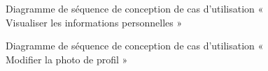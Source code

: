 \begin{figure}[H]
  \centering
  \caption{Diagramme de séquence de conception de cas d'utilisation «  Visualiser les informations personnelles »}
  \label{fig:conception_sequence_visualiser_profil}
\end{figure}

\begin{figure}[H]
  \centering
  \caption{Diagramme de séquence de conception de cas d'utilisation «  Modifier la photo de profil »}
  \label{fig:conception_sequence_edit_profil_avatar}
\end{figure}

